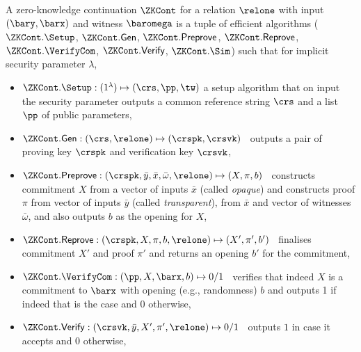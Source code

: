 \begin{definition}[ZK Continuations]
\label{def:zk_cont}
 A zero-knowledge continuation $\ZKCont$ for a relation $\relone$ with 
input $(\bary, \barx)$ and witness $\baromega$ is a tuple of efficient algorithms 
($\ZKCont.\Setup$, $\ZKCont.\Gen$, $\ZKCont.\Preprove$, $\ZKCont.\Reprove$, $\ZKCont.\VerifyCom$, $\ZKCont.\Verify$, $\ZKCont.\Sim$) 
such that for implicit security parameter $\lambda$,
\begin{itemize}

\item $\ZKCont.\Setup: (1^{\lambda}) \mapsto (\crs, \pp, \tw)$ a setup algorithm that on input the security parameter 
outputs a common reference string $\crs$ and a list $\pp$ of public parameters,

\item $\ZKCont.\Gen: (\crs, \relone) \mapsto (\crspk, \crsvk)$ \, 
outputs a pair of proving key $\crspk$ and verification key $\crsvk$, 

\item $\ZKCont.\Preprove: (\crspk, \bar{y}, \bar{x}, \bar{\omega}, \relone) \mapsto (X, \pi, b)$ \,
constructs commitment $X$ from a vector of inputs $\bar{x}$ (called \emph{opaque}) and 
constructs proof $\pi$ from vector of inputs 
$\bar{y}$ (called \emph{transparent}), from $\bar{x}$ and vector of witnesses $\bar{\omega}$, and 
also outputs $b$ as the opening for $X$,

\item $\ZKCont.\Reprove: (\crspk, X, \pi, b, \relone) \mapsto (X', \pi', b')$ \,
finalises commitment $X'$ and proof $\pi'$ and returns an opening $b'$ for the commitment, 

\item $\ZKCont.\VerifyCom: (\pp, X, \barx, b) \mapsto 0/1$ \, 
verifies that indeed $X$ is a commitment to $\barx$ with opening (e.g., randomness) $b$ and 
outputs 1 if indeed that is the case and 0 otherwise,
 
\item $\ZKCont.\Verify: (\crsvk, \bar{y}, X', \pi', \relone) \mapsto 0/1$ \, outputs $1$ in case it accepts and $0$ otherwise,


\end{itemize}
\end{definition}
